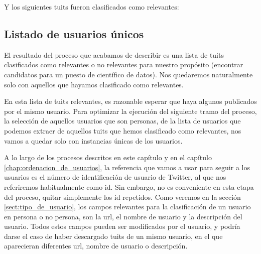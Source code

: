 
Y los siguientes tuits fueron clasificados como relevantes:


\subsection{Listado de usuarios únicos}
\label{subsect:duplicados1}

El resultado del proceso que acabamos de describir
es una lista de tuits clasificados como relevantes o no relevantes
para nuestro propósito (encontrar candidatos para un puesto de científico de datos).
Nos quedaremos naturalmente solo con aquellos que hayamos clasificado como relevantes.

En esta lista de tuits relevantes, es razonable esperar que haya algunos 
publicados por el mismo usuario. Para optimizar la ejecución
del siguiente tramo del proceso, la selección de aquellos usuarios que son personas, 
de la lista de usuarios que podemos extraer de aquellos tuits que hemos clasificado como
relevantes, nos vamos a quedar solo con instancias únicas de los usuarios.

A lo largo de los procesos descritos en este capítulo y en el capítulo
\ref{chap:ordenacion_de_usuarios},
la referencia que vamos a usar para seguir a los usuarios es el número de identificación 
de usuario de Twitter, al que nos referiremos habitualmente como id.
Sin embargo, no es conveniente en esta etapa del proceso, quitar simplemente los id 
repetidos. Como veremos en la sección \ref{sect:tipo_de_usuario}, los campos relevantes
para la clasificación de un usuario en persona o no persona, son 
la url, el nombre de usuario y la descripción del usuario. Todos estos campos
pueden ser modificados por el usuario, y podría darse el caso de haber descargado
tuits de un mismo usuario, en el que aparecieran diferentes url, nombre de usuario o
descripción.

